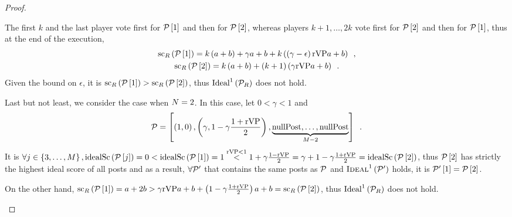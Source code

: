 \begin{proof}
\begin{itemize}
    The first $k$ and the last player vote first for $\mathcal{P}\left[1\right]$
    and then for $\mathcal{P}\left[2\right]$, whereas players $k + 1, \dots, 2k$
    vote first for $\mathcal{P}\left[2\right]$ and then for
    $\mathcal{P}\left[1\right]$, thus at the end of the execution,
    \begin{gather*}
      \mathrm{sc}_{R}\left(\mathcal{P}\left[1\right]\right) = k\left(a +
      b\right) + \gamma a + b + k\left(\left(\gamma - \epsilon\right)\mathrm{rVP} a +
      b\right) \enspace, \\
      \mathrm{sc}_{R}\left(\mathcal{P}\left[2\right]\right) = k\left(a +
      b\right) + \left(k + 1\right)\left(\gamma \mathrm{rVP} a + b\right) \enspace.
    \end{gather*}
    Given the bound on $\epsilon$, it is
    $\mathrm{sc}_{R}\left(\mathcal{P}\left[1\right]\right) >
    \mathrm{sc}_{R}\left(\mathcal{P}\left[2\right]\right)$, thus
    $\mathrm{Ideal}^1\left(\mathcal{P}_{R}\right)$ does not hold.

    Last but not least, we consider the case when $N = 2$. In this
    case, let $0 < \gamma < 1$ and
    \begin{equation*}
      \mathcal{P} = \left[\left(1, 0\right), \left(\gamma, 1 - \gamma\frac{1 +
      \mathrm{rVP}}{2}\right), \underbrace{\mathrm{nullPost}, \dots, \mathrm{nullPost}}_{M -
      2}\right] \enspace.
    \end{equation*}
    It is $\forall j \in \left\{3, \dots, M\right\},
    \mathrm{idealSc}\left(\mathcal{P}\left[j\right]\right) = 0 < \mathrm{idealSc}\left(\mathcal{P}\left[1\right]\right) = 1
    \overset{\mathrm{rVP} < 1}{<} 1 + \gamma\frac{1 - \mathrm{rVP}}{2} = \gamma + 1 -
    \gamma\frac{1 +\mathrm{rVP}}{2} = \mathrm{idealSc}\left(\mathcal{P}\left[2\right]\right)$, thus
    $\mathcal{P}\left[2\right]$ has strictly the highest ideal score of all posts
    and as a result, $\forall \mathcal{P}'$ that contains the same posts as
    $\mathcal{P}$ and $\textsc{Ideal}^1\left(\mathcal{P}'\right)$ holds, it is
    $\mathcal{P}'\left[1\right] = \mathcal{P}\left[2\right]$.

    On the other hand,
    $\mathrm{sc}_{R}\left(\mathcal{P}\left[1\right]\right) = a + 2b > \gamma
    \mathrm{rVP} a + b + \left(1 - \gamma \frac{1 + \mathrm{rVP}}{2}\right) a + b =
    \mathrm{sc}_{R}\left(\mathcal{P}\left[2\right]\right)$, thus
    $\mathrm{Ideal}^1\left(\mathcal{P}_{R}\right)$ does not hold.
  \end{itemize}
\end{proof}
